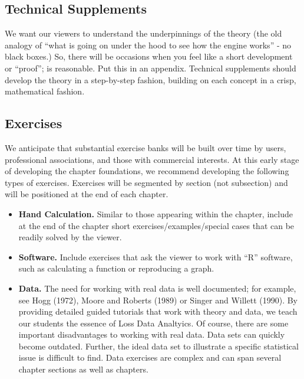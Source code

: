 \documentclass[]{book}
\providecommand{\tightlist}{%
  \setlength{\itemsep}{0pt}\setlength{\parskip}{0pt}}
\theoremstyle{definition}
\theoremstyle{definition}
\theoremstyle{definition}
\theoremstyle{remark}
\begin{document}
\subsection{Technical Supplements}\label{technical-supplements}

We want our viewers to understand the underpinnings of the theory (the
old analogy of ``what is going on under the hood to see how the engine
works'' - no black boxes.) So, there will be occasions when you feel
like a short development or ``proof''; is reasonable. Put this in an
appendix. Technical supplements should develop the theory in a
step-by-step fashion, building on each concept in a crisp, mathematical
fashion.

\subsection{Exercises}\label{exercises}

We anticipate that substantial exercise banks will be built over time by
users, professional associations, and those with commercial interests.
At this early stage of developing the chapter foundations, we recommend
developing the following types of exercises. Exercises will be segmented
by section (not subsection) and will be positioned at the end of each
chapter.

\begin{itemize}
\tightlist
\item
  \textbf{Hand Calculation.} Similar to those appearing within the
  chapter, include at the end of the chapter short
  exercises/examples/special cases that can be readily solved by the
  viewer.
\item
  \textbf{Software.} Include exercises that ask the viewer to work with
  ``R'' software, such as calculating a function or reproducing a graph.
\item
  \textbf{Data.} The need for working with real data is well documented;
  for example, see Hogg (1972), Moore and Roberts (1989) or Singer and
  Willett (1990). By providing detailed guided tutorials that work with
  theory and data, we teach our students the essence of Loss Data
  Analtyics. Of course, there are some important disadvantages to
  working with real data. Data sets can quickly become outdated.
  Further, the ideal data set to illustrate a specific statistical issue
  is difficult to find. Data exercises are complex and can span several
  chapter sections as well as chapters.
\end{itemize}
\end{document}
